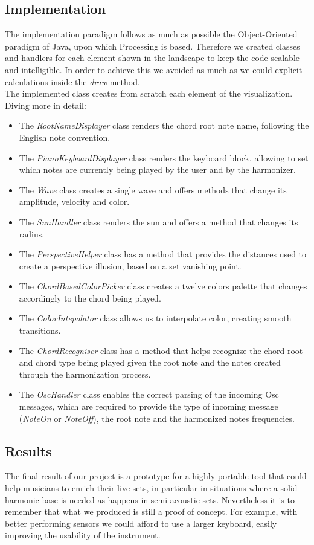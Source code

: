 \documentclass{article}
\begin{document}
\subsection{Implementation}
The implementation paradigm follows as much as possible the Object-Oriented paradigm of Java, upon which Processing is based. Therefore we created classes and handlers for each element shown in the landscape to keep the code scalable and intelligible. In order to achieve this we avoided as much as we could explicit calculations inside the \textit{draw} method.\\
The implemented class creates from scratch each element of the visualization. Diving more in detail:
\begin{itemize}
    \item The \textit{RootNameDisplayer} class renders the chord root note name, following the English note convention.
    \item The \textit{PianoKeyboardDisplayer} class renders the keyboard block, allowing to set which notes are currently being played by the user and by the harmonizer.
    \item The \textit{Wave} class creates a single wave and offers methods that change its amplitude, velocity and color.
    \item The \textit{SunHandler} class renders the sun and offers a method that changes its radius.
    \item The \textit{PerspectiveHelper} class has a method that provides the distances used to create a perspective illusion, based on a set vanishing point.
    \item The \textit{ChordBasedColorPicker} class creates a twelve colors palette that changes accordingly to the chord being played.
    \item The \textit{ColorIntepolator} class allows us to interpolate color, creating smooth transitions.
    \item The \textit{ChordRecogniser} class has a method that helps recognize the chord root and chord type being played given the root note and the notes created through the harmonization process.
    \item The \textit{OscHandler} class enables the correct parsing of the incoming Osc messages, which are required to provide the type of incoming message (\textit{NoteOn} or \textit{NoteOff}), the root note and the harmonized notes frequencies.
\end{itemize}

\subsection{Results}
The final result of our project is a prototype for a highly portable tool that could help musicians to enrich their live sets, in particular in situations where a solid harmonic base is needed as happens in semi-acoustic sets. Nevertheless it is to remember that what we produced is still a proof of concept. For example, with better performing sensors we could afford to use a larger keyboard, easily improving the usability of the instrument. 
\end{document}
